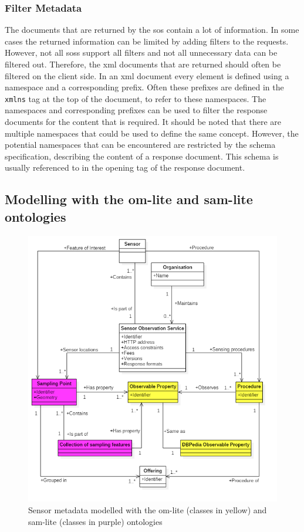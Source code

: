 \subsubsection{Filter Metadata}

The documents that are returned by the \ac{sos} contain a lot of information. In some cases the returned information can be limited by adding filters to the requests. However, not all \aclp{sos} support all filters and not all unnecessary data can be filtered out. Therefore, the \ac{xml} documents that are returned should often be filtered on the client side. In an \ac{xml} document every element is defined using a namespace and a corresponding prefix. Often these prefixes are defined in the \texttt{xmlns} tag at the top of the document, to refer to these namespaces. The namespaces and corresponding prefixes can be used to filter the response documents for the content that is required. It should be noted that there are multiple namespaces that could be used to define the same concept. However, the potential namespaces that can be encountered are restricted by the schema specification, describing the content of a response document. This schema is usually referenced to in the opening tag of the response document.


\subsection{Modelling with the om-lite and sam-lite ontologies}
\label{omsamlite}

\begin{figure}
	\centering
	\includegraphics[width=1\linewidth]{UML/SOS_Semantic_UML_2.PNG}
	\caption{Sensor metadata modelled with the om-lite (classes in yellow) and sam-lite (classes in purple) ontologies}
	\label{fig:SOS_Semantic_UML}
\end{figure}

